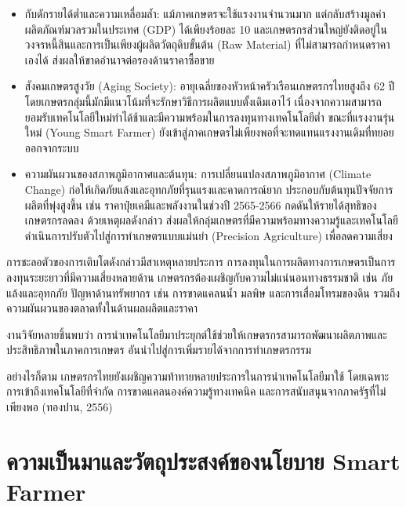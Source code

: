 \begin{itemize}

\item กับดักรายได้ต่ำและความเหลื่อมล้ำ: แม้ภาคเกษตรจะใช้แรงงานจำนวนมาก แต่กลับสร้างมูลค่าผลิตภัณฑ์มวลรวมในประเทศ (GDP) ได้เพียงร้อยละ 10 และเกษตรกรส่วนใหญ่ยังติดอยู่ในวงจรหนี้สินและการเป็นเพียงผู้ผลิตวัตถุดิบขั้นต้น (Raw Material) ที่ไม่สามารถกำหนดราคาเองได้ ส่งผลให้ขาดอำนาจต่อรองด้านราคาซื้อขาย \cite{meechoovet2023}

\item สังคมเกษตรสูงวัย (Aging Society): อายุเฉลี่ยของหัวหน้าครัวเรือนเกษตรกรไทยสูงถึง 62 ปี โดยเกษตรกลุ่มนี้มักมีแนวโน้มที่จะรักษาวิธีการผลิตแบบตั้งเดิมเอาไว้ เนื่องจากความสามารถยอมรับเทคโนโลยีใหม่ทำได้ช้าและมีความพร้อมในการลงทุนทางเทคโนโลยีต่ำ \cite{duang2019} ขณะที่แรงงานรุ่นใหม่ (Young Smart Farmer) ยังเข้าสู่ภาคเกษตรไม่เพียงพอที่จะทดแทนแรงงานเดิมที่ทยอยออกจากระบบ

\item ความผันผวนของสภาพภูมิอากาศและต้นทุน: การเปลี่ยนแปลงสภาพภูมิอากาศ (Climate Change) ก่อให้เกิดภัยแล้งและอุทกภัยที่รุนแรงและคาดการณ์ยาก ประกอบกับต้นทุนปัจจัยการผลิตที่พุ่งสูงขึ้น เช่น ราคาปุ๋ยเคมีและพลังงานในช่วงปี 2565-2566 กดดันให้รายได้สุทธิของเกษตรกรลดลง ด้วยเหตุผลดังกล่าว ส่งผลให้กลุ่มเกษตรที่มีความพร้อมทางความรู้และเทคโนโลยีดำเนินการปรับตัวไปสู่การทำเกษตรแบบแม่นยำ (Precision Agriculture) เพื่อลดความเสี่ยง \cite{hwang2024}

\end{itemize}

การชะลอตัวของการเติบโตดังกล่าวมีสาเหตุหลายประการ การลงทุนในการผลิตทางการเกษตรเป็นการลงทุนระยะยาวที่มีความเสี่ยงหลายด้าน เกษตรกรต้องเผชิญกับความไม่แน่นอนทางธรรมชาติ เช่น ภัยแล้งและอุทกภัย ปัญหาด้านทรัพยากร เช่น การขาดแคลนน้ำ มลพิษ และการเสื่อมโทรมของดิน รวมถึงความผันผวนของตลาดทั้งในด้านผลผลิตและราคา \cite{chadarat2562,un2563}

งานวิจัยหลายชิ้นพบว่า การนำเทคโนโลยีมาประยุกต์ใช้ช่วยให้เกษตรกรสามารถพัฒนาผลิตภาพและประสิทธิภาพในภาคการเกษตร อันนำไปสู่การเพิ่มรายได้จากการทำเกษตรกรรม \cite{jinjarak2550,rueatee2557,thongpan2556}

อย่างไรก็ตาม เกษตรกรไทยยังเผชิญความท้าทายหลายประการในการนำเทคโนโลยีมาใช้ โดยเฉพาะการเข้าถึงเทคโนโลยีที่จำกัด การขาดแคลนองค์ความรู้ทางเทคนิค และการสนับสนุนจากภาครัฐที่ไม่เพียงพอ (ทองปาน, 2556)

\section{ความเป็นมาและวัตถุประสงค์ของนโยบาย Smart Farmer}

